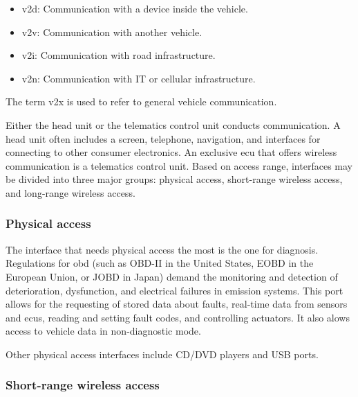 \begin{itemize}
    \item \acrfull{v2d}: Communication with a device inside the vehicle.
    \item \acrfull{v2v}: Communication with another vehicle.
    \item \acrfull{v2i}: Communication with road infrastructure.
    \item \acrfull{v2n}: Communication with IT or cellular infrastructure.
\end{itemize}

The term \acrlong{v2x} is used to refer to general vehicle communication.\par

Either the head unit or the telematics control unit conducts communication. A head unit often includes a screen, telephone, navigation, and interfaces for connecting to other consumer electronics. An exclusive \gls{ecu} that offers wireless communication is a telematics control unit. Based on access range, interfaces may be divided into three major groups: physical access, short-range wireless access, and long-range wireless access.

\subsubsection{Physical access}

The interface that needs physical access the most is the one for diagnosis. Regulations for \gls{obd} (such as OBD-II in the United States, EOBD in the European Union, or JOBD in Japan) demand the monitoring and detection of deterioration, dysfunction, and electrical failures in emission systems. This port allows for the requesting of stored data about faults, real-time data from sensors and \glspl{ecu}, reading and setting fault codes, and controlling actuators. It also alows access to vehicle data in non-diagnostic mode.\par
Other physical access interfaces include CD/DVD players and USB ports.

\subsubsection{Short-range wireless access}

